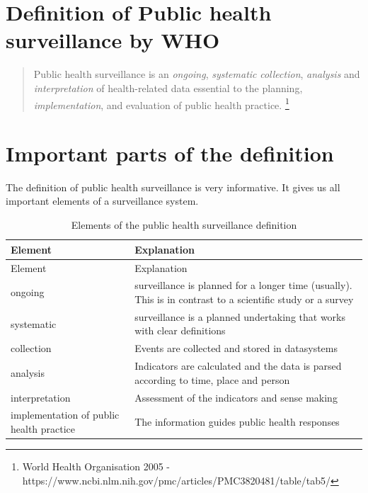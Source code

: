 \documentclass[
  letterpaper,
  DIV=11,
  numbers=noendperiod]{scrreprt}
\begin{document}
\section{Definition of Public health surveillance by
WHO}\label{definition-of-public-health-surveillance-by-who}

\begin{quote}
Public health surveillance is an \emph{ongoing}, \emph{systematic}
\emph{collection}, \emph{analysis} and \emph{interpretation} of
health-related data essential to the planning, \emph{implementation},
and evaluation of public health practice. \footnote{World Health
  Organisation 2005 -
  https://www.ncbi.nlm.nih.gov/pmc/articles/PMC3820481/table/tab5/}
\end{quote}

\section{Important parts of the
definition}\label{important-parts-of-the-definition}

The definition of public health surveillance is very informative. It
gives us all important elements of a surveillance system.

\begin{longtable}[]{@{}
  >{\raggedright\arraybackslash}p{}
  >{\raggedright\arraybackslash}p{}@{}}
\caption{Elements of the public health surveillance
definition}\tabularnewline
\toprule\noalign{}
\begin{minipage}[b]{\linewidth}\raggedright
Element
\end{minipage} & \begin{minipage}[b]{\linewidth}\raggedright
Explanation
\end{minipage} \\
\midrule\noalign{}
\endfirsthead
\toprule\noalign{}
\begin{minipage}[b]{\linewidth}\raggedright
Element
\end{minipage} & \begin{minipage}[b]{\linewidth}\raggedright
Explanation
\end{minipage} \\
\midrule\noalign{}
\endhead
\bottomrule\noalign{}
\endlastfoot
ongoing & surveillance is planned for a longer time (usually). This is
in contrast to a scientific study or a survey \\
systematic & surveillance is a planned undertaking that works with clear
definitions \\
collection & Events are collected and stored in datasystems \\
analysis & Indicators are calculated and the data is parsed according to
time, place and person \\
interpretation & Assessment of the indicators and sense making \\
implementation of public health practice & The information guides public
health responses \\
\end{longtable}
\end{document}
